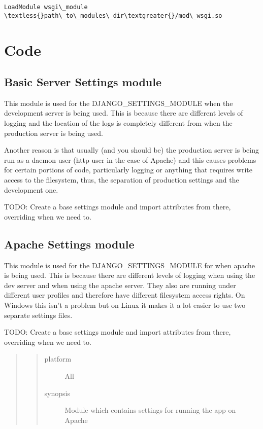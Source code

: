 \documentclass[letterpaper,10pt,english]{sphinxmanual}
\begin{document}
\begin{Verbatim}[commandchars=\\\{\}]
LoadModule wsgi\_module \textless{}path\_to\_modules\_dir\textgreater{}/mod\_wsgi.so
\end{Verbatim}


\section{Code}
\label{code:code}\label{code::doc}

\subsection{Basic Server Settings module}
\label{code:basic-server-settings-module}\label{code:module-timetracker.settings}
This module is used for the DJANGO\_SETTINGS\_MODULE when the development server
is being used. This is because there are different levels of logging and the
location of the logs is completely different from when the production server
is being used.

Another reason is that usually (and you should be) the production server is
being run as a daemon user (http user in the case of Apache) and this causes
problems for certain portions of code, particularly logging or anything that
requires write access to the filesystem, thus, the separation of production
settings and the development one.

TODO: Create a base settings module and import attributes from there,
overriding when we need to.


\subsection{Apache Settings module}
\label{code:module-timetracker.apache_settings}\label{code:apache-settings-module}
This module is used for the DJANGO\_SETTINGS\_MODULE for when apache is being
used. This is because there are different levels of logging when using the dev
server and when using the apache server. They also are running under different
user profiles and therefore have different filesystem access rights. On
Windows this isn't a problem but on Linux it makes it a lot easier to use two
separate settings files.

TODO: Create a base settings module and import attributes from there,
overriding when we need to.
\begin{quote}
\begin{quote}\begin{description}
\item[{platform}] \leavevmode
All

\item[{synopsis}] \leavevmode
Module which contains settings for running the app on Apache

\end{description}\end{quote}
\end{quote}
\end{document}
